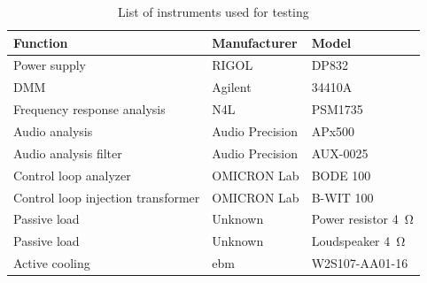 \begin{table}[H]
	\centering
	\begin{tabular}{@{}lll@{}}
		\toprule
		\textbf{Function} & \textbf{Manufacturer} & \textbf{Model} \\ \midrule
		Power supply & RIGOL & DP832 \\
		DMM & Agilent & 34410A \\
		Frequency response analysis & N4L & PSM1735 \\
		Audio analysis & Audio Precision & APx500 \\
		Audio analysis filter & Audio Precision & AUX-0025 \\
		Control loop analyzer & OMICRON Lab & BODE 100 \\
		Control loop injection transformer & OMICRON Lab & B-WIT 100 \\
		Passive load & Unknown & Power resistor \SI{4}{\ohm} \\
		Passive load & Unknown & Loudspeaker \SI{4}{\ohm} \\
		Active cooling & ebm & W2S107-AA01-16 \\ \bottomrule
	\end{tabular}
	\caption{List of instruments used for testing}
	\label{tab:instruments_hardware}
\end{table}
